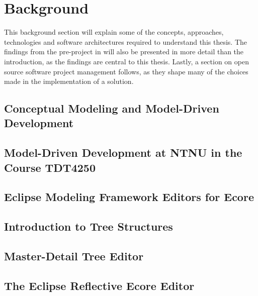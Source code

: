 \chapter{Background}\label{chap:background}

This background section will explain some of the concepts, approaches, technologies and software architectures required to understand this thesis.
The findings from the pre-project in \cite{rekstadModelingEnvironmentCloud2020} will also be presented in more detail than the introduction, as the findings are central to this thesis.
Lastly, a section on open source software project management follows, as they shape many of the choices made in the implementation of a solution.

\section{Conceptual Modeling and Model-Driven Development}\label{sec:conceptual-modeling}




\section{Model-Driven Development at NTNU in the Course TDT4250}\label{sec:tdt4250}




\section{Eclipse Modeling Framework Editors for Ecore}\label{sec:emf-editors}




\section{Introduction to Tree Structures}\label{sec:tree-structures}




\section{Master-Detail Tree Editor}\label{sec:master-detail}




\section{The Eclipse Reflective Ecore Editor}

